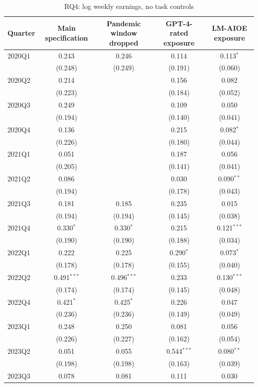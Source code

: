 \begin{table}[htbp]\centering
\caption{RQ4: log weekly earnings, no task controls}
\begin{tabular}{lcccc}
\toprule
Quarter & Main specification & Pandemic window dropped & GPT-4-rated exposure & LM-AIOE exposure \\
\midrule
2020Q1 & 0.243 & 0.246 & 0.114 & 0.113$^{*}$ \\
 & (0.248) & (0.249) & (0.191) & (0.060) \\
2020Q2 & 0.214 &  & 0.156 & 0.082 \\
 & (0.223) &  & (0.184) & (0.052) \\
2020Q3 & 0.249 &  & 0.109 & 0.050 \\
 & (0.194) &  & (0.140) & (0.041) \\
2020Q4 & 0.136 &  & 0.215 & 0.082$^{*}$ \\
 & (0.226) &  & (0.180) & (0.044) \\
2021Q1 & 0.051 &  & 0.187 & 0.056 \\
 & (0.205) &  & (0.141) & (0.041) \\
2021Q2 & 0.086 &  & 0.030 & 0.090$^{**}$ \\
 & (0.194) &  & (0.178) & (0.043) \\
2021Q3 & 0.181 & 0.185 & 0.235 & 0.015 \\
 & (0.194) & (0.194) & (0.145) & (0.038) \\
2021Q4 & 0.330$^{*}$ & 0.330$^{*}$ & 0.215 & 0.121$^{***}$ \\
 & (0.190) & (0.190) & (0.188) & (0.034) \\
2022Q1 & 0.222 & 0.225 & 0.290$^{*}$ & 0.073$^{*}$ \\
 & (0.178) & (0.178) & (0.155) & (0.040) \\
2022Q2 & 0.491$^{***}$ & 0.496$^{***}$ & 0.233 & 0.130$^{***}$ \\
 & (0.174) & (0.174) & (0.145) & (0.048) \\
2022Q4 & 0.421$^{*}$ & 0.425$^{*}$ & 0.226 & 0.047 \\
 & (0.236) & (0.236) & (0.149) & (0.049) \\
2023Q1 & 0.248 & 0.250 & 0.081 & 0.056 \\
 & (0.226) & (0.227) & (0.162) & (0.054) \\
2023Q2 & 0.051 & 0.055 & 0.544$^{***}$ & 0.080$^{**}$ \\
 & (0.198) & (0.198) & (0.163) & (0.039) \\
2023Q3 & 0.078 & 0.081 & 0.111 & 0.030 \\

\end{tabular}
\end{table}

